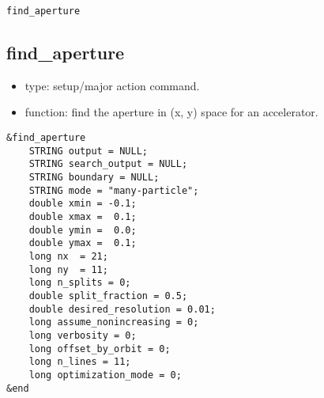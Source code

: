 \documentclass[11pt]{article}
\begin{document}
\begin{latexonly}
\newpage
\begin{center}{\Large\verb|find_aperture|}\end{center}
\end{latexonly}
\subsection{find\_aperture \label{subsec:findaperture}}

\begin{itemize}
\item type: setup/major action command.
\item function: find the aperture in (x, y) space for an accelerator.
\end{itemize}

\begin{verbatim}
&find_aperture
    STRING output = NULL;
    STRING search_output = NULL;
    STRING boundary = NULL;
    STRING mode = "many-particle";
    double xmin = -0.1;
    double xmax =  0.1;
    double ymin =  0.0;
    double ymax =  0.1;
    long nx  = 21;
    long ny  = 11;
    long n_splits = 0;
    double split_fraction = 0.5;
    double desired_resolution = 0.01;
    long assume_nonincreasing = 0;
    long verbosity = 0;    
    long offset_by_orbit = 0;
    long n_lines = 11;
    long optimization_mode = 0;
&end
\end{verbatim}
\end{document}

